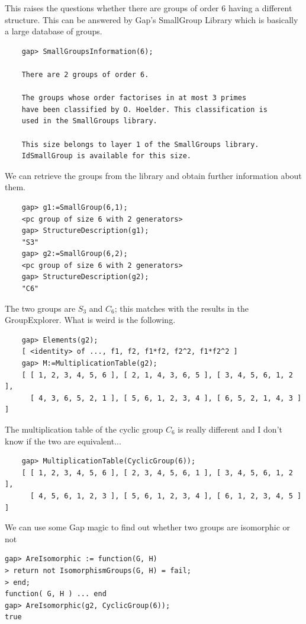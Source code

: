 This raises the questions whether there are groups of order $6$ having a different structure. This can be answered by Gap's SmallGroup Library which is basically a large database of groups.

\begin{verbatim}
    gap> SmallGroupsInformation(6);

    There are 2 groups of order 6.

    The groups whose order factorises in at most 3 primes 
    have been classified by O. Hoelder. This classification is 
    used in the SmallGroups library. 

    This size belongs to layer 1 of the SmallGroups library. 
    IdSmallGroup is available for this size. 
\end{verbatim}

We can retrieve the groups from the library and obtain further information about them.

\begin{verbatim}
    gap> g1:=SmallGroup(6,1);
    <pc group of size 6 with 2 generators>
    gap> StructureDescription(g1);
    "S3"
    gap> g2:=SmallGroup(6,2);
    <pc group of size 6 with 2 generators>
    gap> StructureDescription(g2);
    "C6"
\end{verbatim}

The two groups are $S_3$ and $C_6$; this matches with the results in the GroupExplorer. What is weird is the following.

\begin{verbatim}
    gap> Elements(g2);
    [ <identity> of ..., f1, f2, f1*f2, f2^2, f1*f2^2 ]
    gap> M:=MultiplicationTable(g2);
    [ [ 1, 2, 3, 4, 5, 6 ], [ 2, 1, 4, 3, 6, 5 ], [ 3, 4, 5, 6, 1, 2 ], 
      [ 4, 3, 6, 5, 2, 1 ], [ 5, 6, 1, 2, 3, 4 ], [ 6, 5, 2, 1, 4, 3 ] ]
\end{verbatim}

The multiplication table of the cyclic group $C_6$ is really different and I don't know if the two are equivalent...

\begin{verbatim}
    gap> MultiplicationTable(CyclicGroup(6));
    [ [ 1, 2, 3, 4, 5, 6 ], [ 2, 3, 4, 5, 6, 1 ], [ 3, 4, 5, 6, 1, 2 ], 
      [ 4, 5, 6, 1, 2, 3 ], [ 5, 6, 1, 2, 3, 4 ], [ 6, 1, 2, 3, 4, 5 ] ]
\end{verbatim}

We can use some Gap magic to find out whether two groups are isomorphic or not 

\begin{verbatim}
gap> AreIsomorphic := function(G, H)
> return not IsomorphismGroups(G, H) = fail;
> end;
function( G, H ) ... end
gap> AreIsomorphic(g2, CyclicGroup(6));
true
\end{verbatim}

